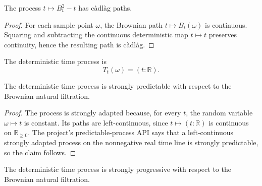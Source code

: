 \begin{lemma}\label{lem:isCadlag_brownian_sq_sub_time}
  \leanok
The process \(t\mapsto B_t^2-t\) has càdlàg paths.
\end{lemma}

\begin{proof}

\leanok
For each sample point \(\omega\), the Brownian path \(t\mapsto B_t(\omega)\)
is continuous.  Squaring and subtracting the continuous deterministic map
\(t\mapsto t\) preserves continuity, hence the resulting path is càdlàg.
\end{proof}

\begin{definition}\label{def:brownianDeterministicTime}
  \leanok
The deterministic time process is
\[
  T_t(\omega)=(t:\mathbb R).
\]
\end{definition}

\begin{lemma}\label{lem:brownianDeterministicTime_predictable}
  \leanok
The deterministic time process is strongly predictable with respect to the
Brownian natural filtration.
\end{lemma}

\begin{proof}

\leanok
The process is strongly adapted because, for every \(t\), the random variable
\(\omega\mapsto t\) is constant.  Its paths are left-continuous, since
\(t\mapsto (t:\mathbb R)\) is continuous on \(\mathbb R_{\ge 0}\).  The
project's predictable-process API says that a left-continuous strongly adapted
process on the nonnegative real time line is strongly predictable, so the
claim follows.
\end{proof}

\begin{lemma}\label{lem:brownianDeterministicTime_progressive}
  \leanok
The deterministic time process is strongly progressive with respect to the
Brownian natural filtration.
\end{lemma}

